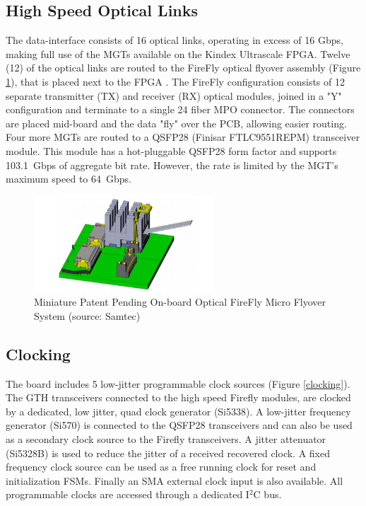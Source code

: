 \documentclass[a4paper]{PoS}
\begin{document}
\subsection{High Speed Optical Links}
The data-interface consists of 16 optical links, operating in excess of 16 Gbps, making full use of the MGTs available on the Kindex Ultrascale FPGA. Twelve (12) of the optical links are routed to the FireFly optical flyover assembly (Figure \ref{firefly}), that is placed next to the FPGA \cite{zbinden2018connector}. The FireFly configuration consists of 12 separate transmitter (TX) and receiver (RX) optical modules, joined in a "Y" configuration and terminate to a single 24 fiber MPO connector. The connectors are placed mid-board and the data "fly" over the PCB, allowing easier routing. Four more MGTs are routed to a QSFP28 (Finisar FTLC9551REPM) transceiver module. This module has a hot-pluggable QSFP28 form factor and supports 103.1~Gbps of aggregate bit rate. However, the rate is limited by the MGT's maximum speed to 64~Gbps.

\begin{figure}
\centering
\includegraphics[width=0.6\textwidth]{firefly.png}
\caption{Miniature Patent Pending On-board Optical FireFly Micro
Flyover System (source: Samtec) }
\label{firefly}
\end{figure}


\subsection{Clocking}
The board includes 5 low-jitter programmable clock sources (Figure \ref{clocking}). The GTH transceivers connected to the high speed Firefly modules, are clocked by a dedicated, low jitter, quad clock generator (Si5338). A low-jitter frequency generator (Si570) is connected to the QSFP28 transceivers and can also be used as a secondary clock source to the Firefly transceivers. A jitter attenuator (Si5328B) is used to reduce the jitter of a received recovered clock. A fixed frequency clock source can be used as a free running clock for reset and initialization FSMs. Finally an SMA external clock input is also available. All programmable clocks are accessed through a dedicated I$^2$C bus.
\end{document}
